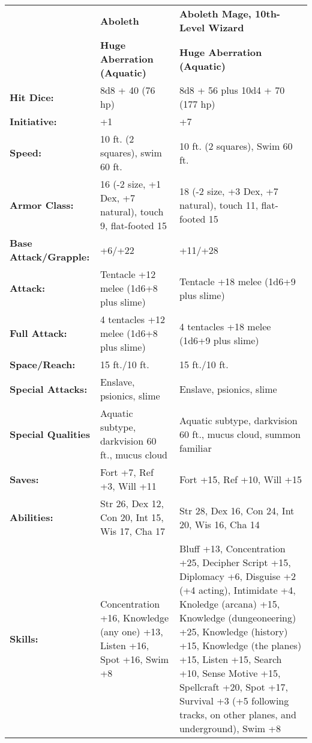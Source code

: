 \documentclass[../main.tex]{subfiles}
\begin{document}
\begin{table}[]
\centering
\label{my-label}
\begin{tabular}{p{9em}p{16em}p{20em}}
 & \textbf{Aboleth} & \textbf{Aboleth Mage, 10th-Level Wizard} \\
 & \textbf{Huge Aberration (Aquatic)} & \textbf{Huge Aberration (Aquatic)} \\
\rowcolor[HTML]{FFCE93} 
\textbf{Hit Dice:} & 8d8 + 40 (76 hp) & 8d8 + 56 plus 10d4 + 70 (177 hp) \\
\textbf{Initiative:} & +1 & +7 \\
\rowcolor[HTML]{FFCE93} 
\textbf{Speed:} & 10 ft. (2 squares), swim 60 ft. & 10 ft. (2 squares), Swim 60 ft. \\
\textbf{Armor Class:} & 16 (-2 size, +1 Dex, +7 natural), touch 9, flat-footed 15 & 18 (-2 size, +3 Dex, +7 natural), touch 11, flat-footed 15 \\
\rowcolor[HTML]{FFCE93} 
\textbf{Base Attack/Grapple:} & +6/+22 & +11/+28 \\
\textbf{Attack:} & Tentacle +12 melee (1d6+8 plus slime) & Tentacle +18 melee (1d6+9 plus slime) \\
\rowcolor[HTML]{FFCE93} 
\textbf{Full Attack:} & 4 tentacles +12 melee (1d6+8 plus slime) & 4 tentacles +18 melee (1d6+9 plus slime) \\
\textbf{Space/Reach:} & 15 ft./10 ft. & 15 ft./10 ft. \\
\rowcolor[HTML]{FFCE93} 
\textbf{Special Attacks:} & Enslave, psionics, slime & Enslave, psionics, slime \\
\textbf{Special Qualities} & Aquatic subtype, darkvision 60 ft., mucus cloud & Aquatic subtype, darkvision 60 ft., mucus cloud, summon familiar \\
\rowcolor[HTML]{FFCE93} 
\textbf{Saves:} & Fort +7, Ref +3, Will +11 & Fort +15, Ref +10, Will +15 \\
\textbf{Abilities:} & Str 26, Dex 12, Con 20, Int 15, Wis 17, Cha 17 & Str 28, Dex 16, Con 24, Int 20, Wis 16, Cha 14 \\
\rowcolor[HTML]{FFCE93} 
\textbf{Skills:} & Concentration +16, Knowledge (any one) +13, Listen +16, Spot +16, Swim +8 & Bluff +13, Concentration +25, Decipher Script +15, Diplomacy +6, Disguise +2 (+4 acting), Intimidate +4, Knoledge (arcana) +15, Knowledge (dungeoneering) +25, Knowledge (history) +15, Knowledge (the planes) +15, Listen +15, Search +10, Sense Motive +15, Spellcraft +20, Spot +17, Survival +3 (+5 following tracks, on other planes, and underground), Swim +8 \\

\end{tabular}
\end{table}
\end{document}
